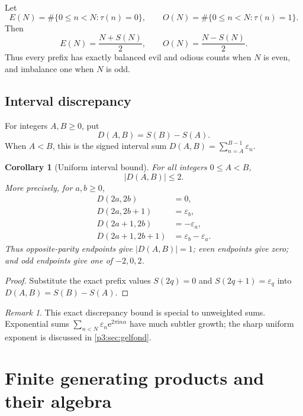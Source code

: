 \documentclass[11pt,oneside]{article}
\newtheorem{corollary}[theorem]{Corollary}
\theoremstyle{definition}
\theoremstyle{remark}
\newtheorem{remark}[theorem]{Remark}
\newcommand{\e}{\mathrm e}
\newcommand{\ii}{\mathrm i}
\newcommand{\eps}{\varepsilon}
\begin{document}
Let
\[
 E(N)=\#\{0\le n<N:\tau(n)=0\},
 \qquad
 O(N)=\#\{0\le n<N:\tau(n)=1\}.
\]
Then
\begin{equation}\label{p3:eq:evil-odious-counts}
 E(N)=\frac{N+S(N)}2,
 \qquad
 O(N)=\frac{N-S(N)}2.
\end{equation}
Thus every prefix has exactly balanced evil and odious counts when $N$ is
even, and imbalance one when $N$ is odd.

\subsection{Interval discrepancy}

For integers $A,B\ge0$, put
\[
 D(A,B)=S(B)-S(A).
\]
When $A<B$, this is the signed interval sum
$D(A,B)=\sum_{n=A}^{B-1}\eps_n$.

\begin{corollary}[Uniform interval bound]\label{p3:cor:interval-discrepancy}
For all integers $0\le A<B$,
\begin{equation}\label{p3:eq:interval-discrepancy}
 |D(A,B)|\le2.
\end{equation}
More precisely, for $a,b\ge0$,
\begin{align}
 D(2a,2b)&=0,\label{p3:eq:interval-even-even}\\
 D(2a,2b+1)&=\eps_b,\label{p3:eq:interval-even-odd}\\
 D(2a+1,2b)&=-\eps_a,\label{p3:eq:interval-odd-even}\\
 D(2a+1,2b+1)&=\eps_b-\eps_a.\label{p3:eq:interval-odd-odd}
\end{align}
Thus opposite-parity endpoints give $|D(A,B)|=1$; even endpoints give zero;
and odd endpoints give one of $-2,0,2$.
\end{corollary}

\begin{proof}
Substitute the exact prefix values
$S(2q)=0$ and $S(2q+1)=\eps_q$ into $D(A,B)=S(B)-S(A)$.
\end{proof}

\begin{remark}
This exact discrepancy bound is special to unweighted sums.  Exponential sums
$\sum_{n<N}\eps_n\e^{2\pi\ii n\alpha}$ have much subtler growth; the sharp
uniform exponent is discussed in \cref{p3:sec:gelfond}.
\end{remark}

\section{Finite generating products and their algebra}
\end{document}
